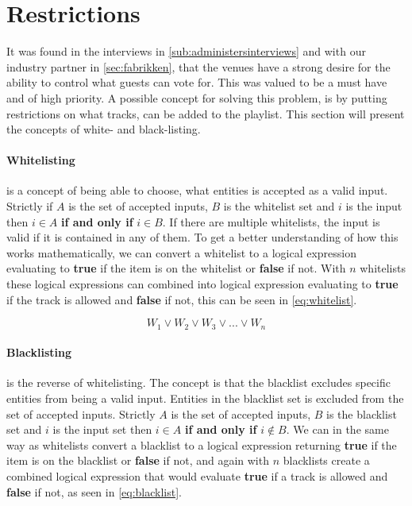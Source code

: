 \section{Restrictions}
\label{sec:restrictions}

It was found in the interviews in \cref{sub:administersinterviews} and with our industry partner in \cref{sec:fabrikken}, that the venues have a strong desire for the ability to control what guests can vote for. This was valued to be a must have and of high priority. A possible concept for solving this problem, is by putting restrictions on what tracks, can be added to the playlist. This section will present the concepts of white- and black-listing.

\paragraph{Whitelisting} is a concept of being able to choose, what entities is accepted as a valid input. Strictly if $A$ is the set of accepted inputs, $B$ is the whitelist set and $i$ is the input then $i \in A$ \textbf{if and only if} $i \in B$. If there are multiple whitelists, the input is valid if it is contained in any of them.
To get a better understanding of how this works mathematically, we can convert a whitelist to a logical expression evaluating to \textbf{true} if the item is on the whitelist or \textbf{false} if not. With $n$ whitelists these logical expressions can combined into logical expression evaluating to \textbf{true} if the track is allowed and \textbf{false} if not, this can be seen in \cref{eq:whitelist}.

\begin{equation}
\label{eq:whitelist}
	W_1 \vee W_2 \vee W_3 \vee ... \vee W_n
\end{equation}

\paragraph{Blacklisting} is the reverse of whitelisting. The concept is that the blacklist excludes specific entities from being a valid input. Entities in the blacklist set is excluded from the set of accepted inputs. Strictly $A$ is the set of accepted inputs, $B$ is the blacklist set and $i$ is the input set then $i \in A$ \textbf{if and only if} $i \notin B$.
We can in the same way as whitelists convert a blacklist to a logical expression returning \textbf{true} if the item is on the blacklist or \textbf{false} if not, and again with $n$ blacklists create a combined logical expression that would evaluate \textbf{true} if a track is allowed and \textbf{false} if not, as seen in \cref{eq:blacklist}.

